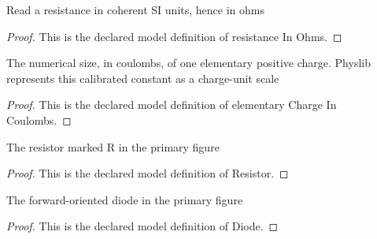 \begin{definition}
  \label{def:physics:phyx-mini-0629:phyxminiproblems-problemphyxmini0629-resistanceinohms}
  Read a resistance in coherent SI units, hence in ohms
\end{definition}
\begin{proof}
  This is the declared model definition of resistance In Ohms.
\end{proof}
\begin{definition}
  \label{def:physics:phyx-mini-0629:phyxminiproblems-problemphyxmini0629-elementarychargeincoulombs}
  The numerical size, in coulombs, of one elementary positive charge. Physlib represents this calibrated constant as a charge-unit scale
\end{definition}
\begin{proof}
  This is the declared model definition of elementary Charge In Coulombs.
\end{proof}
\begin{definition}[Resistor]
  \label{def:physics:phyx-mini-0629:phyxminiproblems-problemphyxmini0629-resistor}
  The resistor marked R in the primary figure
\end{definition}
\begin{proof}
  This is the declared model definition of Resistor.
\end{proof}
\begin{definition}[Diode]
  \label{def:physics:phyx-mini-0629:phyxminiproblems-problemphyxmini0629-diode}
  The forward-oriented diode in the primary figure
\end{definition}
\begin{proof}
  This is the declared model definition of Diode.
\end{proof}
